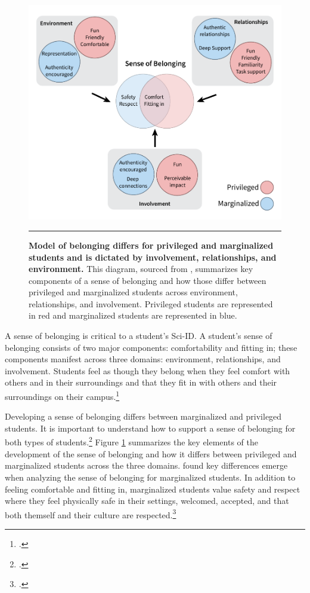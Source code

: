\documentclass[10pt, twocolumn]{article}
\begin{document}
            \begin{figure}[t!]
                \begin{center}
                \includegraphics[height = 0.35 \paperheight]{figures/sense_of_belonging.pdf}
                \end{center}
                \caption{\textbf{Model of belonging differs for privileged and marginalized students and is dictated by involvement, relationships, and environment.} This diagram, sourced from \cite{vaccaro_development_2016}, summarizes key components of a sense of belonging and how those differ between privileged and marginalized students across environment, relationships, and involvement. Privileged students are represented in red and marginalized students are represented in blue.}
                \label{fig:sense_of_belonging}
                \rule{\textwidth}{1pt}
            \end{figure}

            A sense of belonging is critical to a student's Sci-ID.  A student's sense of belonging consists of two major components: comfortability and fitting in; these components manifest across three domains: environment, relationships, and involvement. Students feel as though they belong when they feel comfort with others and in their surroundings and that they fit in with others and their surroundings on their campus.\footcite{vaccaro_development_2016}
            
            Developing a sense of belonging differs between marginalized and privileged students. It is important to understand how to support a sense of belonging for both types of students.\footcite{vaccaro_development_2016} Figure \ref{fig:sense_of_belonging} summarizes the key elements of the development of the sense of belonging and how it differs between privileged and marginalized students across the three domains. \cite{vaccaro_development_2016} found key differences emerge when analyzing the sense of belonging for marginalized students. In addition to feeling comfortable and fitting in, marginalized students value safety and respect where they feel physically safe in their settings, welcomed, accepted, and that both themself and their culture are respected.\footcite{vaccaro_development_2016}
\end{document}
